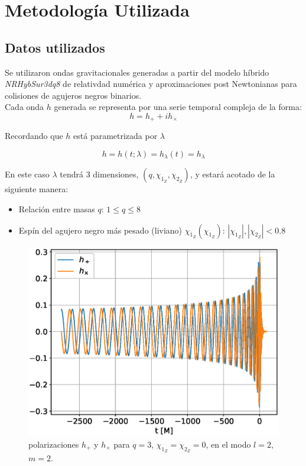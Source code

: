 
\chapter{Metodología Utilizada}

\section{Datos utilizados}


Se utilizaron ondas gravitacionales generadas a partir del modelo híbrido \textit{NRHybSur3dq8}\cite{Varma_2019} de relativdad numérica y aproximaciones post Newtonianas para colisiones de agujeros negros binarios.
\\

Cada onda \(h\) generada se representa por una serie temporal compleja de la forma:
\[
h = h_+ + ih_{\times}
\]


Recordando que $h$ está parametrizada por \(\lambda\)

 \[h = h(t; \lambda) = h_{\lambda}(t) = h_{\lambda} \]
 
En este caso \(\lambda\) tendrá 3 dimensiones, $(q, \chi_{1_Z},\chi_{2_Z}) $, y estará acotado de la siguiente manera:

\begin{itemize}
\item Relación entre masas $q$: $1 \le q \le 8$
\item Espín del agujero negro más pesado (liviano) $\chi_{1_Z} (\chi_{1_Z})$: $|\chi_{1_Z}|, |\chi_{2_Z}| < 0.8$
\end{itemize}

\begin{figure}[h]
\centering
\includegraphics[width=.9\columnwidth]{figs/h_l2m2_q3.eps}
\caption{polarizaciones \(h_+\) y \(h_{\times}\) para $q = 3$, $\chi_{1_Z} = \chi_{2_Z} = 0$, en el modo $l=2$, $m=2$.}
\label{fig:h_q3}
\end{figure}



